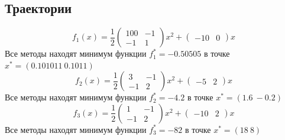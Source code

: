 \documentclass[english]{article}
\begin{document}
\subsection{Траектории}
\[ f_1(x) = \frac{1}{2}\begin{pmatrix}
100 & -1 \\
-1 & 1
\end{pmatrix} x^2 + \begin{pmatrix} -10 & 0 \end{pmatrix}x\]
Все методы находят минимум функции \(f_1^* = -0.50505\) в точке \(x^* = (0.101011\ 0.1011)\)
\[ f_2(x) = \frac{1}{2}\begin{pmatrix}
3 & -1 \\
-1 & 2
\end{pmatrix} x^2 + \begin{pmatrix} -5 & 2 \end{pmatrix}x\]
Все методы находят минимум функции \(f_2^* = -4.2\) в точке \(x^* = (1.6\ -0.2)\)
\[ f_3(x) = \frac{1}{2}\begin{pmatrix}
1 & -1 \\
-1 & 2
\end{pmatrix} x^2 + \begin{pmatrix} -10 & 2 \end{pmatrix}x\]
Все методы находят минимум функции \(f_3^* = -82\) в точке \(x^* = (18\ 8)\) \\
\end{document}

